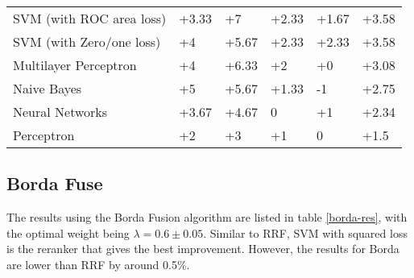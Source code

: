 \begin{table}[h]
{\begin{tabular}{@{}llllll@{}}
SVM (with ROC area loss)                                                                    & +3.33                    & +7                          & +2.33                    & +1.67                       & +3.58             \\ 
SVM (with Zero/one loss)                                                                        & +4                       & +5.67                       & +2.33                    & +2.33                       & +3.58             \\ 
Multilayer Perceptron								& +4 & +6.33 & +2 & +0 & +3.08 \\
Naive Bayes                                                                      & +5                       & +5.67                       & +1.33                    & -1                         & +2.75             \\ 
Neural Networks                                                                   & +3.67                    & +4.67                       & 0                       & +1                          & +2.34             \\ 
Perceptron                                                              & +2                       & +3                          & +1                       & 0                          & +1.5              \\ \bottomrule
\end{tabular}%
}
\end{table}

\subsection{Borda Fuse}
The results using the Borda Fusion algorithm are listed in table \ref{borda-res}, with the optimal weight being $\lambda=0.6\pm0.05$.
Similar to RRF, SVM with squared loss is the reranker that gives the best improvement. However, the results for Borda are lower
than RRF by around 0.5\%.

